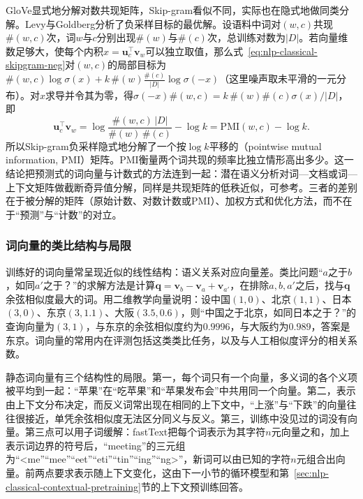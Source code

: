 GloVe显式地分解对数共现矩阵，Skip-gram看似不同，实际也在隐式地做同类分解。Levy与Goldberg分析了负采样目标的最优解。设语料中词对$(w,c)$共现$\#(w,c)$次，词$w$与$c$分别出现$\#(w)$与$\#(c)$次，总训练对数为$|D|$。若向量维数足够大，使每个内积$x=\bm u_c^{\top}\bm v_w$可以独立取值，那么式~\eqref{eq:nlp-classical-skipgram-neg}对$(w,c)$的局部目标为$\#(w,c)\log\sigma(x)+k\,\#(w)\frac{\#(c)}{|D|}\log\sigma(-x)$（这里噪声取未平滑的一元分布）。对$x$求导并令其为零，得$\sigma(-x)\#(w,c)=k\,\#(w)\#(c)\sigma(x)/|D|$，即
\begin{equation}
  \bm u_c^{\top}\bm v_w=\log\frac{\#(w,c)\,|D|}{\#(w)\,\#(c)}-\log k=\mathrm{PMI}(w,c)-\log k.
  \label{eq:nlp-classical-pmi}
\end{equation}
所以Skip-gram负采样隐式地分解了一个按$\log k$平移的（pointwise mutual information, PMI）矩阵。PMI衡量两个词共现的频率比独立情形高出多少。这一结论把预测式的词向量与计数式的方法连到一起：潜在语义分析对词—文档或词—上下文矩阵做截断奇异值分解，同样是共现矩阵的低秩近似，可参考。三者的差别在于被分解的矩阵（原始计数、对数计数或PMI）、加权方式和优化方法，而不在于“预测”与“计数”的对立。

\subsubsection{词向量的类比结构与局限}
\label{sec:nlp-classical-analogy}

训练好的词向量常呈现近似的线性结构：语义关系对应向量差。类比问题“$a$之于$b$，如同$a'$之于？”的求解方法是计算$\bm q=\bm v_b-\bm v_a+\bm v_{a'}$，在排除$a,b,a'$之后，找与$\bm q$余弦相似度最大的词。用二维教学向量说明：设中国$(1,0)$、北京$(1,1)$、日本$(3,0)$、东京$(3,1.1)$、大阪$(3.5,0.6)$，则“中国之于北京，如同日本之于？”的查询向量为$(3,1)$，与东京的余弦相似度约为$0.9996$，与大阪约为$0.989$，答案是东京。词向量的常用内在评测包括这类类比任务，以及与人工相似度评分的相关系数。

静态词向量有三个结构性的局限。第一，每个词只有一个向量，多义词的各个义项被平均到一起：“苹果”在“吃苹果”和“苹果发布会”中共用同一个向量。第二，表示由上下文分布决定，而反义词常出现在相同的上下文中，“上涨”与“下跌”的向量往往很接近，单凭余弦相似度无法区分同义与反义。第三，训练中没见过的词没有向量。第三点可以用子词缓解：fastText把每个词表示为其字符$n$元向量之和，加上表示词边界的符号后，“meeting”的三元组为“<me”“mee”“eet”“eti”“tin”“ing”“ng>”，新词可以由已知的字符$n$元组合出向量。前两点要求表示随上下文变化，这由下一小节的循环模型和第~\ref{sec:nlp-classical-contextual-pretraining}节的上下文预训练回答。

